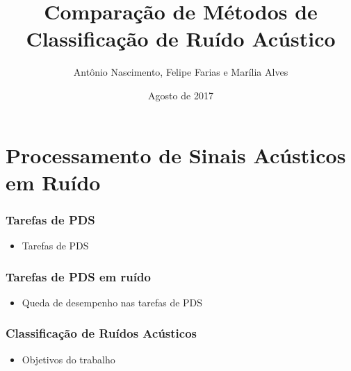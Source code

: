 \documentclass{beamer}
\title[Ciência de Dados]{Comparação de Métodos de Classificação de Ruído Acústico}
\author[Nascimento, Farias, Alves]
{
Antônio Nascimento, Felipe Farias e Marília Alves
}
\institute[IME]{%
Instituto Militar de Engenharia \\
}
\date[Agosto de 2017] %
{Agosto de 2017}
\begin{document}

\justifying

\begin{frame}
  \titlepage
\end{frame}




\section[Sumário]{}
\begin{frame}
  \tableofcontents
\end{frame}




\section{Processamento de Sinais Acústicos em Ruído}


\begin{frame}
	\justifying
  	\frametitle{Tarefas de PDS}
  	
  	\begin{itemize}
  		 \setlength\itemsep{1em}
  		\item Tarefas de PDS  		
  	\end{itemize}
\end{frame}

\begin{frame}
	\justifying
  	\frametitle{Tarefas de PDS em ruído}
  	
  	\begin{itemize}
  		 \setlength\itemsep{1em}
  		\item Queda de desempenho nas tarefas de PDS 
  	\end{itemize}
\end{frame}

\begin{frame}
	\justifying
  	\frametitle{Classificação de Ruídos Acústicos}
  	
  	\begin{itemize}
  		 \setlength\itemsep{1em}
  		\item Objetivos do trabalho
 	\end{itemize}
  		
\end{frame}
\end{document}
